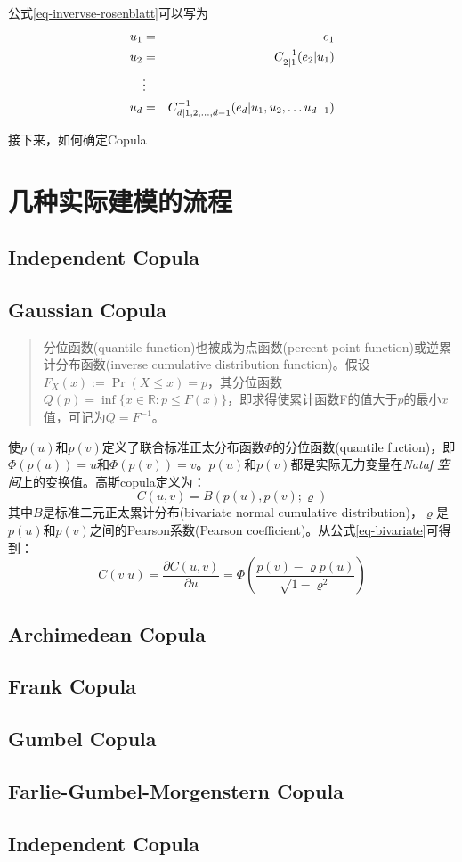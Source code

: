 公式\ref{eq-invervse-rosenblatt}可以写为
\begin{eqnarray}
    \label{eq-inverse-transform-using-copula}
    u_1 &=& e_1 \notag \\
    u_2 &=& C_{2|1}^{-1}(e_2|u_1) \notag\\
    &\vdots& \\
    u_d &=& C_{d|1,2,\dots,d-1}^{-1}(e_d|u_1,u_2,\dots u_{d-1}) \notag
\end{eqnarray}

接下来，如何确定Copula


\section{几种实际建模的流程}

\subsection{Independent Copula}
\subsection{Gaussian Copula}
\begin{quotation}
    分位函数(quantile function)也被成为点函数(percent point function)或逆累计分布函数(inverse cumulative distribution function)。假设$F_X(x) := \Pr (X \leq x) = p$，其分位函数$Q(p) = \inf\{x \in \mathbb{R} : p \leq F(x)\}$，即求得使累计函数F的值大于$p$的最小$x$值，可记为$Q = F^{-1}$。
\end{quotation}

使$p(u)$和$p(v)$定义了联合标准正太分布函数$\Phi$的\textcolor[rgb]{1,0,0}{分位函数(quantile fuction)}，即$\Phi(p(u)) = u$和$\Phi(p(v))=v$。$p(u)$和$p(v)$都是实际无力变量在\emph{Nataf 空间}上的变换值。高斯copula定义为：
\begin{equation}
    \label{eq-gaussiancopula}
    C(u,v) = B(p(u),p(v);\varrho)
\end{equation}
其中$B$是标准二元正太累计分布(bivariate normal cumulative distribution)，$\varrho$是$p(u)$和$p(v)$之间的Pearson系数(Pearson coefficient)。从公式\ref{eq-bivariate}可得到：
\begin{equation} 
    \label{eq-copula-bivariate}
    C(v|u) = \dfrac{\partial C(u,v)}{\partial u} = \Phi \left(\dfrac{p(v)-\varrho p(u)}{\sqrt{1-\varrho^{2}}}\right)
\end{equation} 


\subsection{Archimedean Copula}
\subsection{Frank Copula}
\subsection{Gumbel Copula}
\subsection{Farlie-Gumbel-Morgenstern  Copula}
\subsection{Independent Copula}
